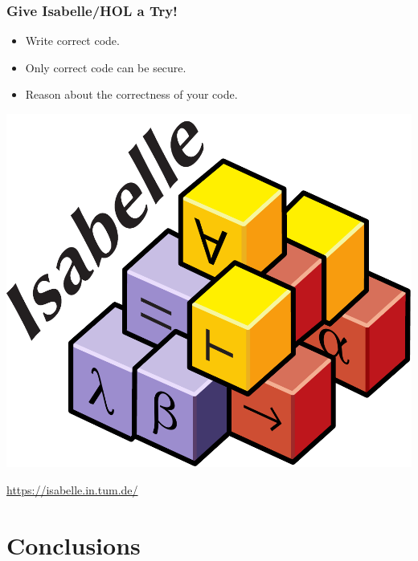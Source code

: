 \documentclass[aspectratio=169,t]{beamer}
\begin{document}
\begin{frame}
	\frametitle{Give Isabelle/HOL a Try!}
	\vspace*{5ex}
	\begin{itemize}
		\item Write correct code.
		\item Only correct code can be secure.
		\item Reason about the correctness of your code.
	\end{itemize}
	\medskip
	\begin{center}
		\includegraphics[scale=.2]{isabelle.pdf}
	\end{center}
	\url{https://isabelle.in.tum.de/}
\end{frame}



\appendix
\backupbegin

\section{Conclusions}
\end{document}
